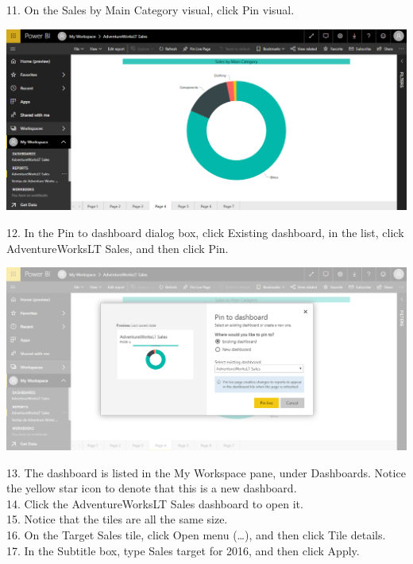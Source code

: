 11. On the Sales by Main Category visual, click Pin visual.\\

	\begin{center}
	\includegraphics[width=17cm]{./Imagenes/Ejercicio3/Tarea2/9}
	\end{center}	

12. In the Pin to dashboard dialog box, click Existing dashboard, in the list, click AdventureWorksLT
Sales, and then click Pin.\\

	\begin{center}
	\includegraphics[width=17cm]{./Imagenes/Ejercicio3/Tarea2/10}
	\end{center}	

13. The dashboard is listed in the My Workspace pane, under Dashboards. Notice the yellow star icon
to denote that this is a new dashboard.\\
14. Click the AdventureWorksLT Sales dashboard to open it.\\
15. Notice that the tiles are all the same size.\\
16. On the Target Sales tile, click Open menu (…), and then click Tile details.\\
17. In the Subtitle box, type Sales target for 2016, and then click Apply.\\

